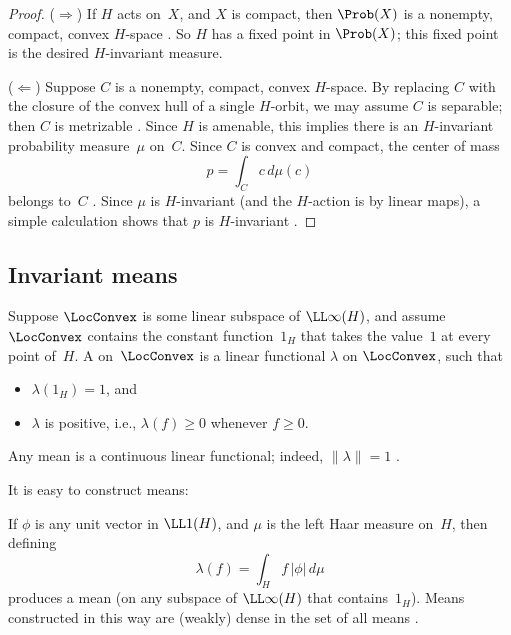 \begin{proof}
($\Rightarrow$) If $H$ acts on~$X$, and $X$ is compact, then $\Prob(X)$ is a nonempty, compact, convex $H$-space . So $H$ has a fixed point in $\Prob(X)$; this fixed point is the desired $H$-invariant measure.

\medbreak

($\Leftarrow$)
Suppose $C$ is a nonempty, compact, convex $H$-space.
By replacing $C$ with the closure of the convex hull of a single $H$-orbit, we may assume $C$ is separable; then $C$ is metrizable  . Since $H$ is amenable, this implies there is an $H$-invariant probability measure~$\mu$ on~$C$.
Since $C$ is convex and compact, the center of mass
	$$ p = \int_C c \, d\mu(c) $$
belongs to~$C$ . Since $\mu$ is $H$-invariant (and the $H$-action is by linear maps), a simple calculation shows that $p$ is $H$-invariant .
\end{proof}



\subsection{Invariant means}

\begin{defn}
Suppose $\LocConvex$ is some linear subspace of $\LL\infty(H)$, and assume $\LocConvex$ contains the constant function~$1_H$ that takes the value~$1$ at every point of~$H$.
A  on~$\LocConvex$ is
a linear functional
$\lambda$ on $\LocConvex$, such that
\noprelistbreak
 \begin{itemize}
 \item $\lambda(1_H) = 1$,
 and
 \item $\lambda$ is positive, i.e., $\lambda(f) \ge 0$
whenever $f \ge 0$.
 \end{itemize}
 \end{defn}

\begin{rem} \label{MeanNorm1}
Any mean is a continuous linear functional; indeed, $\|\lambda\| = 1$ .
\end{rem}
 
 It is easy to construct means:
 
 \begin{eg} \label{EasyMeans}
 If $\phi$ is any unit vector in $\LL1(H)$, and $\mu$ is the left Haar measure on~$H$, then defining
 	$$ \lambda(f) = \int_H f\, |\phi| \, d\mu$$
produces a mean (on any subspace of $\LL\infty(H)$ that contains~$1_H$). Means constructed in this way are (weakly) dense in the set of all means .
 \end{eg}
 
